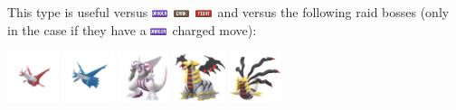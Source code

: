 \documentclass[12pt]{beamer}
\newcommand{\fightingfull}{\includegraphics[height=0.2cm]{../../images/type/full/Fighting.png}}
\newcommand{\darkfull}{\includegraphics[height=0.2cm]{../../images/type/full/Dark.png}}
\newcommand{\dragonfull}{\includegraphics[height=0.2cm]{../../images/type/full/Dragon.png}}
\begin{document}
\begin{frame}
\begin{footnotesize}
\begin{block}{}\begin{center}
This type is useful versus \dragonfull~\darkfull~\fightingfull~and versus the following raid bosses (only in the case if they have a \dragonfull~charged move):

    \includegraphics[width=1.5cm]{../../images/pokemon/latias.png}
    \includegraphics[width=1.5cm]{../../images/pokemon/latios.png}
    \includegraphics[width=1.5cm]{../../images/pokemon/palkia.png}\quad
    \includegraphics[width=1.5cm]{../../images/pokemon/giratina_a.png}\quad
    \includegraphics[width=1.5cm]{../../images/pokemon/giratina_o.png}
\end{center}
\end{block}

\end{footnotesize}
\end{frame}



\end{document}
